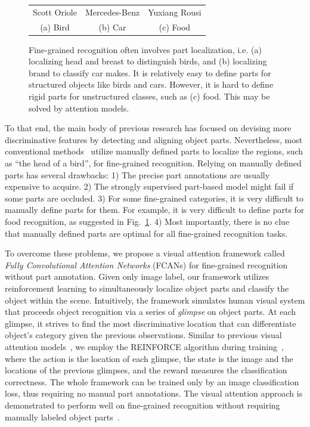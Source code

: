 \documentclass[10pt,twocolumn,letterpaper]{article}
\begin{document}
\begin{figure}[t]
\begin{center}
\begin{tabular}{ccc}
Scott Oriole & Mercedes-Benz & Yuxiang Rousi \\
(a) Bird & (b) Car & (c) Food
\end{tabular}
\end{center}
\caption{Fine-grained recognition often involves part localization, i.e. (a) localizing head and breast to distinguish birds, and (b) localizing brand to classify car makes.
It is relatively easy to define parts for structured objects like birds and cars.
However, it is hard to define rigid parts for unstructured classes, such as (c) food.
This may be solved by attention models.
}
\label{fig:teaser2}
\end{figure}

To that end, the main body of previous research has focused on devising more discriminative features by detecting and aligning object parts.
Nevertheless, most conventional methods~\cite{liu2012dog, branson2014bird} utilize manually defined parts to localize the regions, such as ``the head of a bird'', for fine-grained recognition.
Relying on manually defined parts has several drawbacks:
1) The precise part annotations are usually expensive to acquire.
2) The strongly supervised part-based model might fail if some parts are occluded.
3) For some fine-grained categories, it is very difficult to manually define parts for them.
For example, it is very difficult to define parts for food recognition, as suggested in Fig.~\ref{fig:teaser2}.
4) Most importantly, there is no clue that manually defined parts are optimal for all fine-grained recognition tasks.

To overcome these problems, we propose a visual attention framework called {\em Fully Convolutional Attention Networks} (FCANs) for fine-grained recognition without part annotation.
Given only image label, our framework utilizes reinforcement learning to simultaneously localize object parts and classify the object within the scene.
Intuitively, the framework simulates human visual system that proceeds object recognition via a series of {\em glimpse} on object parts.
At each glimpse, it strives to find the most discriminative location that can differentiate object's category given the previous observations.
Similar to previous visual attention models~\cite{mnih2014recurrent, sermanet2014attention}, we employ the REINFORCE algorithm during training~\cite{williams1992simple}, where the action is the location of each glimpse, the state is the image and the locations of the previous glimpses, and the reward measures the classification correctness.
The whole framework can be trained only by an image classification loss, thus requiring no manual part annotations.
The visual attention approach is demonstrated to perform well on fine-grained recognition without requiring manually labeled object parts~\cite{sermanet2014attention}.
\end{document}
